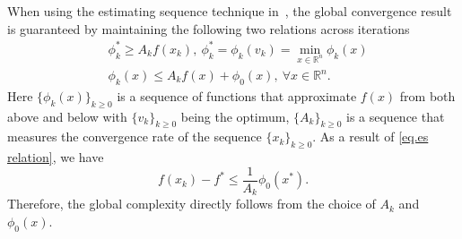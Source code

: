 \documentclass{mcom-l}
\numberwithin{equation}{section}
\begin{document}
When using the estimating sequence technique in~\cite{nesterov2008accelerating}, the global convergence result is guaranteed by maintaining the following two relations across iterations
\begin{subequations}\label{eq.es relation}
    \begin{align}
        \label{eq.es relation 1}
         & \phi_k^*  \geq A_k f(x_k), \  \phi_k^*= \phi_k(v_k) =\min_{x\in\mathbb{R}^n}\phi_k(x) \\
        \label{eq.es relation 2}
         & \phi_k(x)\leq A_kf(x)+\phi_0(x), \ \forall x\in\mathbb{R}^n.
    \end{align}
\end{subequations}
Here $\{\phi_k(x)\}_{k\geq 0}$ is a sequence of functions that approximate $f(x)$ from both above and below with $\{v_k\}_{k\geq0}$ being the optimum, $\{A_k\}_{k\geq 0}$ is a sequence that measures the convergence rate of the sequence $\{x_k\}_{k\geq 0}$. As a result of \eqref{eq.es relation}, we have
\begin{equation*}
    f(x_k)-f^*\leq \frac{1}{A_k}\phi_0(x^*).
\end{equation*}
Therefore, the global complexity directly follows from the choice of $A_k$ and $\phi_0(x)$.
\end{document}
